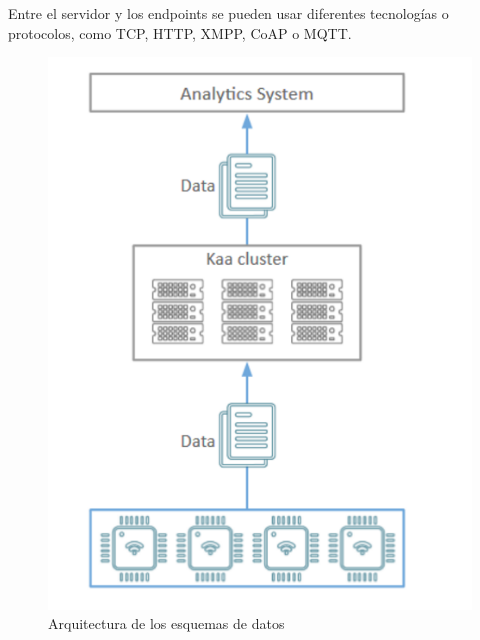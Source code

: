 \documentclass[12pt, twoside]{book}
\begin{document}
Entre el servidor y los endpoints se pueden usar diferentes tecnologías o protocolos, como TCP, HTTP, XMPP, CoAP o MQTT. 

\begin{figure}[H]
\centering
\includegraphics[scale=0.4]{images/log_schema}
\caption{Arquitectura de los esquemas de datos}\label{L503}
\end{figure} 
\end{document}
